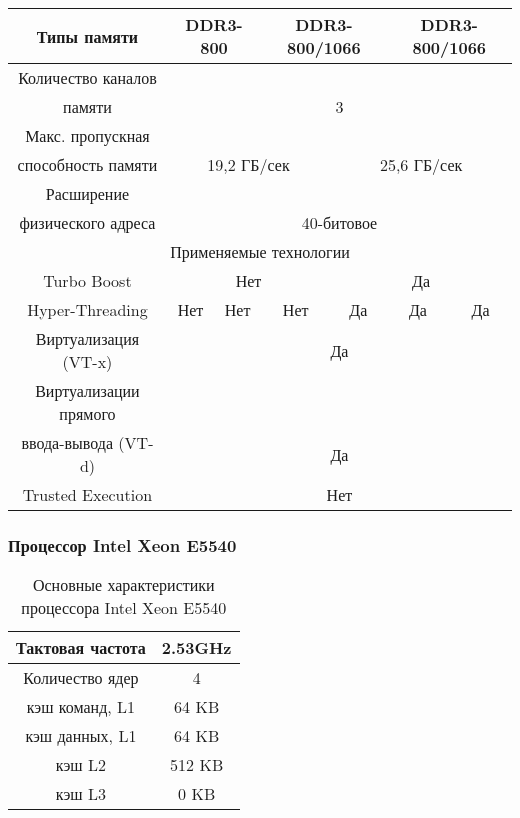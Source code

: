 \begin{center}
\begin{table}[ht]
\begin{tabular}{|c|c|c|c|c|c|c|}
		Типы памяти & \multicolumn{2}{c|}{DDR3-800} & \multicolumn{2}{c|}{DDR3-800/1066} & \multicolumn{2}{c|}{DDR3-800/1066} \\ \hline
		Количество каналов & \multicolumn{6}{c|}{} \\
		памяти & \multicolumn{6}{c|}{3} \\ \hline
		Макс. пропускная & \multicolumn{6}{c|}{} \\ \hline
		способность памяти & \multicolumn{3}{c|}{19,2 ГБ/сек} & \multicolumn{3}{c|}{25,6 ГБ/сек }\\ \hline
		Расширение         & \multicolumn{6}{c|}{} \\ 
		физического адреса & \multicolumn{6}{c|}{40-битовое} \\ \hline
		\multicolumn{7}{|c|}{Применяемые технологии} \\ \hline
		Turbo Boost & \multicolumn{3}{c|}{Нет} & \multicolumn{3}{c|}{Да} \\ \hline
		Hyper-Threading & Нет & Нет & Нет & Да & Да & Да \\ \hline
		Виртуализация (VT-x) & \multicolumn{6}{c|}{Да} \\ \hline
		Виртуализации прямого & \multicolumn{6}{c|}{} \\
		ввода-вывода (VT-d)   & \multicolumn{6}{c|}{ Да} \\ \hline
		Trusted Execution &   \multicolumn{6}{c|}{ Нет} \\ \hline
	\end{tabular}
\end{table}
\end{center}





\subsubsection{Процессор Intel Xeon  E5540}
\label{app_E5540}


\begin{table}[ht]
\begin{center}
\caption{Основные характеристики процессора Intel Xeon  E5540}
\begin{tabular}{|c|c|}
\hline	
Тактовая частота & 2.53GHz   \\ \hline
Количество ядер & 4 	     \\ \hline
кэш команд, L1 &  64 KB      \\ \hline
кэш данных, L1 &  64 KB       \\ \hline
кэш L2         &  512 KB      \\ \hline
кэш L3         &  0 KB        \\ \hline
\end{tabular}
\end{center} 	
\end{table} 	


